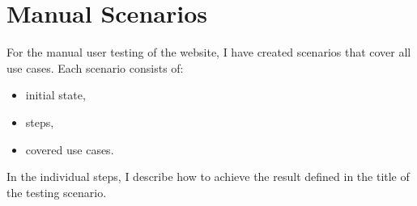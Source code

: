 \section{Manual Scenarios}
For the manual user testing of the website, I have created scenarios that cover all use cases.
Each scenario consists of:
\begin{itemize}
    \item initial state,
    \item steps,
    \item covered use cases.
\end{itemize}

In the individual steps, I describe how to achieve the result defined in the title of the testing scenario.



